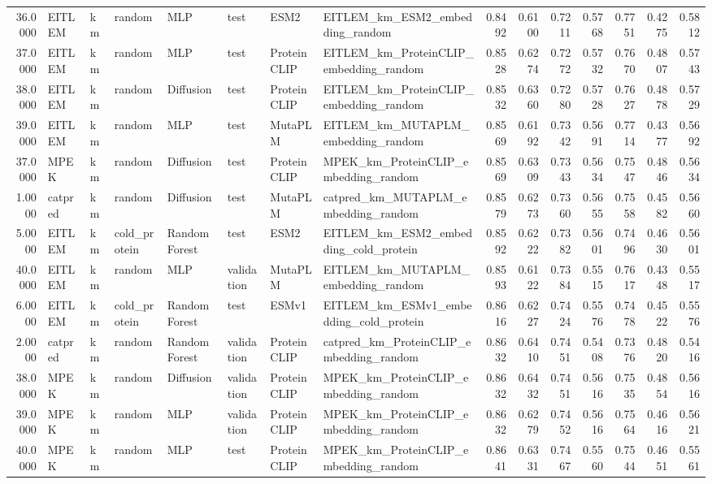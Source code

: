 \begin{tabular}{rlllllllrrrrrrr}
36.0000 & EITLEM & km & random & MLP & test & ESM2 & EITLEM_km_ESM2_embedding_random & 0.8492 & 0.6100 & 0.7211 & 0.5768 & 0.7751 & 0.4275 & 0.5812 \\
37.0000 & EITLEM & km & random & MLP & test & ProteinCLIP & EITLEM_km_ProteinCLIP_embedding_random & 0.8528 & 0.6274 & 0.7272 & 0.5732 & 0.7670 & 0.4807 & 0.5743 \\
38.0000 & EITLEM & km & random & Diffusion & test & ProteinCLIP & EITLEM_km_ProteinCLIP_embedding_random & 0.8532 & 0.6360 & 0.7280 & 0.5728 & 0.7627 & 0.4878 & 0.5729 \\
39.0000 & EITLEM & km & random & MLP & test & MutaPLM & EITLEM_km_MUTAPLM_embedding_random & 0.8569 & 0.6192 & 0.7342 & 0.5691 & 0.7714 & 0.4377 & 0.5692 \\
37.0000 & MPEK & km & random & Diffusion & test & ProteinCLIP & MPEK_km_ProteinCLIP_embedding_random & 0.8569 & 0.6309 & 0.7343 & 0.5634 & 0.7547 & 0.4846 & 0.5634 \\
1.0000 & catpred & km & random & Diffusion & test & MutaPLM & catpred_km_MUTAPLM_embedding_random & 0.8579 & 0.6273 & 0.7360 & 0.5655 & 0.7558 & 0.4582 & 0.5660 \\
5.0000 & EITLEM & km & cold_protein & Random Forest & test & ESM2 & EITLEM_km_ESM2_embedding_cold_protein & 0.8592 & 0.6222 & 0.7382 & 0.5601 & 0.7496 & 0.4630 & 0.5601 \\
40.0000 & EITLEM & km & random & MLP & validation & MutaPLM & EITLEM_km_MUTAPLM_embedding_random & 0.8593 & 0.6122 & 0.7384 & 0.5515 & 0.7617 & 0.4348 & 0.5517 \\
6.0000 & EITLEM & km & cold_protein & Random Forest & test & ESMv1 & EITLEM_km_ESMv1_embedding_cold_protein & 0.8616 & 0.6227 & 0.7424 & 0.5576 & 0.7478 & 0.4522 & 0.5576 \\
2.0000 & catpred & km & random & Random Forest & validation & ProteinCLIP & catpred_km_ProteinCLIP_embedding_random & 0.8632 & 0.6410 & 0.7451 & 0.5408 & 0.7376 & 0.4820 & 0.5416 \\
38.0000 & MPEK & km & random & Diffusion & validation & ProteinCLIP & MPEK_km_ProteinCLIP_embedding_random & 0.8632 & 0.6432 & 0.7451 & 0.5616 & 0.7535 & 0.4854 & 0.5616 \\
39.0000 & MPEK & km & random & MLP & validation & ProteinCLIP & MPEK_km_ProteinCLIP_embedding_random & 0.8632 & 0.6279 & 0.7452 & 0.5616 & 0.7564 & 0.4616 & 0.5621 \\
40.0000 & MPEK & km & random & MLP & test & ProteinCLIP & MPEK_km_ProteinCLIP_embedding_random & 0.8641 & 0.6331 & 0.7467 & 0.5560 & 0.7544 & 0.4651 & 0.5561 \\

\end{tabular}
